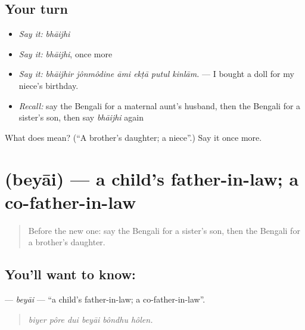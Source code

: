 \subsection*{Your turn}
\begin{itemize}
\raggedright
  \item \emph{Say it:} \emph{bhāijhi}
  \item \emph{Say it:} \emph{bhāijhi}, once more
  \item \emph{Say it:} \emph{bhāijhir jônmôdine āmi ekṭā putul kinlām.} — I bought a doll for my niece's birthday.
  \item \emph{Recall:} say the Bengali for a maternal aunt's husband, then the Bengali for a sister's son, then say \emph{bhāijhi} again
\end{itemize}

\begin{tcolorbox}[breakable,colback=teal!4,colframe=teal!35!black,title={Before you move on}]
What does  mean? (\textquotedblleft{}A brother's daughter; a niece\textquotedblright{}.) Say it once more.
\end{tcolorbox}
\section[\texorpdfstring{\bn{বেয়াই} (beyāi)}{বেয়াই (beyāi)}]{ (beyāi) — a child's father-in-law; a co-father-in-law}

\label{lesson:BN-C482-beyai}



\begin{quote}
Before the new one: say the Bengali for a sister's son, then the Bengali for a brother's daughter.
\end{quote}

\subsection*{You'll want to know: }
\textbf{} — \emph{beyāi} — \textquotedblleft{}a child's father-in-law; a co-father-in-law\textquotedblright{}.

\begin{quote}
     
\end{quote}

\begin{quote}
\emph{biyer pôre dui beyāi bôndhu hôlen.}
\end{quote}

